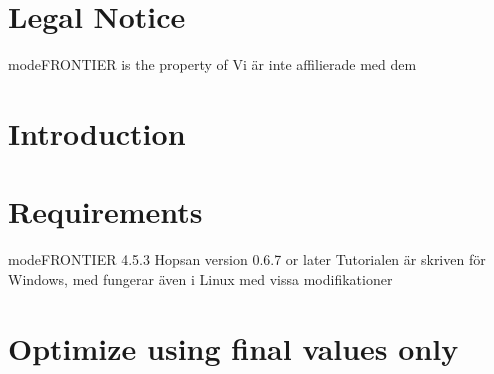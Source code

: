 \documentclass[a4paper]{article}
\begin{document}

\section*{Legal Notice}
modeFRONTIER is the property of
Vi är inte affilierade med dem

\section*{Introduction}

\section*{Requirements}
modeFRONTIER 4.5.3
Hopsan version 0.6.7 or later
Tutorialen är skriven för Windows, med fungerar även i Linux med vissa modifikationer



\section*{Optimize using final values only}
\end{document}
